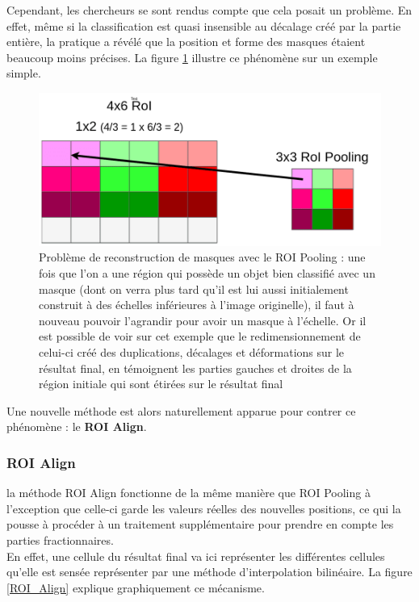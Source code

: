Cependant, les chercheurs se sont rendus compte que cela posait un problème. En effet, même si la classification est quasi insensible au décalage créé par la partie entière, la pratique a révélé que la position et forme des masques étaient beaucoup moins précises. La figure \ref{ROI_pooling_problem} illustre ce phénomène sur un exemple simple.

\begin{figure}[!h]
\centering
\includegraphics[width=200pts]{images/Mask_R_CNN/ROI_pooling_problem.png} 
\caption{Problème de reconstruction de masques avec le ROI Pooling : une fois que l'on a une région qui possède un objet bien classifié avec un masque (dont on verra plus tard qu'il est lui aussi initialement construit à des échelles inférieures à l'image originelle), il faut à nouveau pouvoir l'agrandir pour avoir un masque à l'échelle. Or il est possible de voir sur cet exemple que le redimensionnement de celui-ci créé des duplications, décalages et déformations sur le résultat final, en témoignent les parties gauches et droites de la région initiale qui sont étirées sur le résultat final}
\label{ROI_pooling_problem}
\end{figure}

Une nouvelle méthode est alors naturellement apparue pour contrer ce phénomène : le \textbf{ROI Align}.

\subsubsection{ROI Align}

la méthode ROI Align fonctionne de la même manière que ROI Pooling à l'exception que celle-ci garde les valeurs réelles des nouvelles positions, ce qui la pousse à procéder à un traitement supplémentaire pour prendre en compte les parties fractionnaires.\\
En effet, une cellule du résultat final va ici représenter les différentes cellules qu'elle est sensée représenter par une méthode d'interpolation bilinéaire. La figure \ref{ROI_Align} explique graphiquement ce mécanisme.

